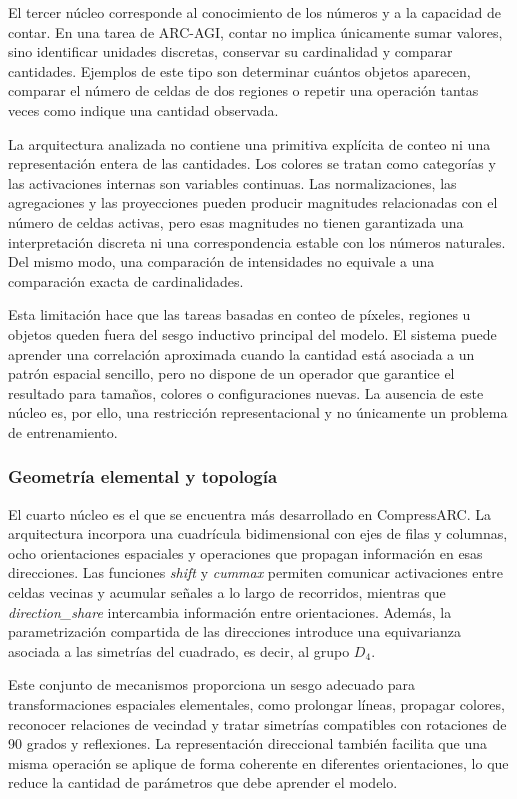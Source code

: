 \documentclass[11pt,a4paper,spanish]{book}
\numberwithin{equation}{chapter}
\numberwithin{figure}{chapter}
\begin{document}
El tercer núcleo corresponde al conocimiento de los números y a la capacidad de contar. En una tarea de ARC-AGI, contar no implica
únicamente sumar valores, sino identificar unidades discretas, conservar su cardinalidad y comparar cantidades. Ejemplos de este tipo
son determinar cuántos objetos aparecen, comparar el número de celdas de dos regiones o repetir una operación tantas veces como
indique una cantidad observada.

La arquitectura analizada no contiene una primitiva explícita de conteo ni una representación entera de las cantidades. Los colores
se tratan como categorías y las activaciones internas son variables continuas. Las normalizaciones, las agregaciones y las
proyecciones pueden producir magnitudes relacionadas con el número de celdas activas, pero esas magnitudes no tienen garantizada una
interpretación discreta ni una correspondencia estable con los números naturales. Del mismo modo, una comparación de intensidades no
equivale a una comparación exacta de cardinalidades.

Esta limitación hace que las tareas basadas en conteo de píxeles, regiones u objetos queden fuera del sesgo inductivo principal del
modelo. El sistema puede aprender una correlación aproximada cuando la cantidad está asociada a un patrón espacial sencillo, pero no
dispone de un operador que garantice el resultado para tamaños, colores o configuraciones nuevas. La ausencia de este núcleo es,
por ello, una restricción representacional y no únicamente un problema de entrenamiento.

\subsubsection{Geometría elemental y topología}

El cuarto núcleo es el que se encuentra más desarrollado en CompressARC. La arquitectura incorpora una cuadrícula bidimensional con
ejes de filas y columnas, ocho orientaciones espaciales y operaciones que propagan información en esas direcciones. Las funciones
\textit{shift} y \textit{cummax} permiten comunicar activaciones entre celdas vecinas y acumular señales a lo largo de recorridos,
mientras que \textit{direction\_share} intercambia información entre orientaciones. Además, la parametrización compartida de las
direcciones introduce una equivarianza asociada a las simetrías del cuadrado, es decir, al grupo $D_4$.

Este conjunto de mecanismos proporciona un sesgo adecuado para transformaciones espaciales elementales, como prolongar líneas,
propagar colores, reconocer relaciones de vecindad y tratar simetrías compatibles con rotaciones de 90 grados y reflexiones. La
representación direccional también facilita que una misma operación se aplique de forma coherente en diferentes orientaciones, lo que
reduce la cantidad de parámetros que debe aprender el modelo.
\end{document}
